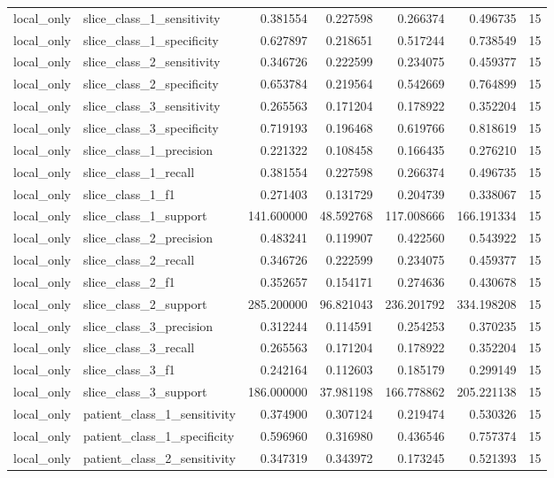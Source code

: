 \begin{tabular}{llrrrrr}
local_only & slice_class_1_sensitivity & 0.381554 & 0.227598 & 0.266374 & 0.496735 & 15 \\
local_only & slice_class_1_specificity & 0.627897 & 0.218651 & 0.517244 & 0.738549 & 15 \\
local_only & slice_class_2_sensitivity & 0.346726 & 0.222599 & 0.234075 & 0.459377 & 15 \\
local_only & slice_class_2_specificity & 0.653784 & 0.219564 & 0.542669 & 0.764899 & 15 \\
local_only & slice_class_3_sensitivity & 0.265563 & 0.171204 & 0.178922 & 0.352204 & 15 \\
local_only & slice_class_3_specificity & 0.719193 & 0.196468 & 0.619766 & 0.818619 & 15 \\
local_only & slice_class_1_precision & 0.221322 & 0.108458 & 0.166435 & 0.276210 & 15 \\
local_only & slice_class_1_recall & 0.381554 & 0.227598 & 0.266374 & 0.496735 & 15 \\
local_only & slice_class_1_f1 & 0.271403 & 0.131729 & 0.204739 & 0.338067 & 15 \\
local_only & slice_class_1_support & 141.600000 & 48.592768 & 117.008666 & 166.191334 & 15 \\
local_only & slice_class_2_precision & 0.483241 & 0.119907 & 0.422560 & 0.543922 & 15 \\
local_only & slice_class_2_recall & 0.346726 & 0.222599 & 0.234075 & 0.459377 & 15 \\
local_only & slice_class_2_f1 & 0.352657 & 0.154171 & 0.274636 & 0.430678 & 15 \\
local_only & slice_class_2_support & 285.200000 & 96.821043 & 236.201792 & 334.198208 & 15 \\
local_only & slice_class_3_precision & 0.312244 & 0.114591 & 0.254253 & 0.370235 & 15 \\
local_only & slice_class_3_recall & 0.265563 & 0.171204 & 0.178922 & 0.352204 & 15 \\
local_only & slice_class_3_f1 & 0.242164 & 0.112603 & 0.185179 & 0.299149 & 15 \\
local_only & slice_class_3_support & 186.000000 & 37.981198 & 166.778862 & 205.221138 & 15 \\
local_only & patient_class_1_sensitivity & 0.374900 & 0.307124 & 0.219474 & 0.530326 & 15 \\
local_only & patient_class_1_specificity & 0.596960 & 0.316980 & 0.436546 & 0.757374 & 15 \\
local_only & patient_class_2_sensitivity & 0.347319 & 0.343972 & 0.173245 & 0.521393 & 15 \\

\end{tabular}
